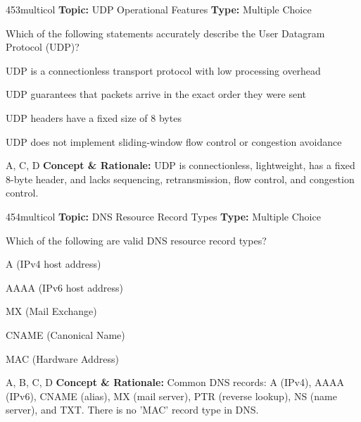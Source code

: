 \begin{qcard}{453}{multicol}
\textcolor{darkslate!75}{\small\textbf{Topic:} UDP Operational Features \hfill \textbf{Type:} Multiple Choice}\vspace{0.4em}\par
Which of the following statements accurately describe the User Datagram Protocol (UDP)?
\begin{qoptions}
\item UDP is a connectionless transport protocol with low processing overhead
\item UDP guarantees that packets arrive in the exact order they were sent
\item UDP headers have a fixed size of 8 bytes
\item UDP does not implement sliding-window flow control or congestion avoidance
\end{qoptions}
\end{qcard}
\nopagebreak
\begin{explainbox}{A, C, D}
\textbf{Concept \& Rationale:} UDP is connectionless, lightweight, has a fixed 8-byte header, and lacks sequencing, retransmission, flow control, and congestion control.
\end{explainbox}

\begin{qcard}{454}{multicol}
\textcolor{darkslate!75}{\small\textbf{Topic:} DNS Resource Record Types \hfill \textbf{Type:} Multiple Choice}\vspace{0.4em}\par
Which of the following are valid DNS resource record types?
\begin{qoptions}
\item A (IPv4 host address)
\item AAAA (IPv6 host address)
\item MX (Mail Exchange)
\item CNAME (Canonical Name)
\item MAC (Hardware Address)
\end{qoptions}
\end{qcard}
\nopagebreak
\begin{explainbox}{A, B, C, D}
\textbf{Concept \& Rationale:} Common DNS records: A (IPv4), AAAA (IPv6), CNAME (alias), MX (mail server), PTR (reverse lookup), NS (name server), and TXT. There is no 'MAC' record type in DNS.
\end{explainbox}

